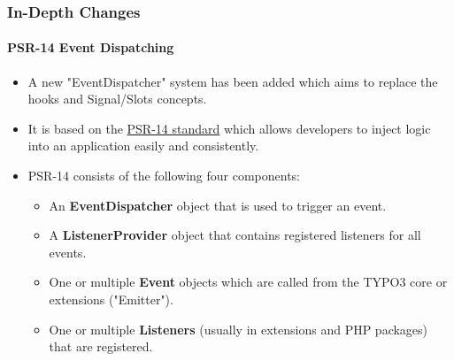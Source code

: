 \begin{frame}[fragile]
	\frametitle{In-Depth Changes}
	\framesubtitle{PSR-14 Event Dispatching}

	\begin{itemize}
		\item A new "EventDispatcher" system has been added which aims to replace
			the hooks and Signal/Slots concepts.

		\item It is based on the \href{https://www.php-fig.org/psr/psr-14}{PSR-14 standard}
			which allows developers to inject logic into an application easily and consistently.

		\item PSR-14 consists of the following four components:

			\begin{itemize}
				\item An \textbf{EventDispatcher} object that is used to trigger an event.
				\item A \textbf{ListenerProvider} object that contains registered listeners for all events.
				\item One or multiple \textbf{Event} objects which are called from the TYPO3 core or extensions ("Emitter").
				\item One or multiple \textbf{Listeners} (usually in extensions and PHP packages) that are registered.
			\end{itemize}


	\end{itemize}

\end{frame}


